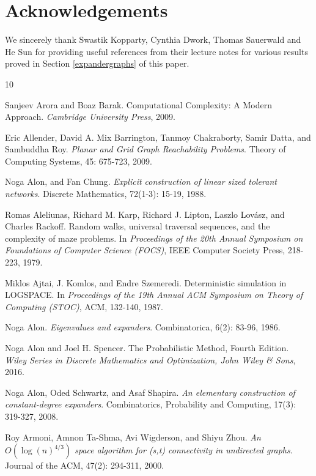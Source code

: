 \documentclass{article}
\begin{document}
\newpage

\section*{Acknowledgements}
We sincerely thank Swastik Kopparty, Cynthia Dwork, Thomas Sauerwald and He Sun for providing useful references from their lecture notes for various results proved in Section \ref{expandergraphs} of this paper.

\begin{thebibliography}{10}

{\sc Sanjeev Arora and Boaz Barak}. {Computational Complexity: A Modern Approach}. {\em Cambridge University Press}, 2009.

{\sc Eric Allender, David A. Mix Barrington, Tanmoy Chakraborty, Samir Datta, and Sambuddha Roy}. {\em Planar and Grid Graph Reachability Problems}. Theory of Computing Systems, 45: 675-723, 2009.

{\sc Noga Alon, and Fan Chung}. {\em Explicit construction of linear sized tolerant networks}. Discrete Mathematics, 72(1-3): 15-19, 1988.

{\sc Romas Aleliunas, Richard M. Karp, Richard J. Lipton, Laszlo Lov\'{a}sz, and Charles Rackoff}. {Random walks, universal traversal sequences, and the complexity of maze problems}. In {\em Proceedings of the 20th Annual Symposium on Foundations of Computer Science (FOCS)}, IEEE Computer Society Press, 218-223, 1979.

{\sc Miklos Ajtai, J. Komlos, and Endre Szemeredi}. {Deterministic simulation in LOGSPACE}. In {\em Proceedings of the 19th Annual ACM Symposium on Theory of Computing (STOC)}, ACM, 132-140, 1987.

{\sc Noga Alon}. {\em Eigenvalues and expanders}. Combinatorica, 6(2): 83-96, 1986.

{\sc Noga Alon and Joel H. Spencer}. {The Probabilistic Method, Fourth Edition}. {\em Wiley Series in Discrete Mathematics and Optimization, John Wiley \& Sons}, 2016.

{\sc Noga Alon, Oded Schwartz, and Asaf Shapira}. {\em An elementary construction of constant-degree expanders}. Combinatorics, Probability and Computing, 17(3): 319-327, 2008.

{\sc Roy Armoni, Amnon Ta-Shma, Avi Wigderson, and Shiyu Zhou}. {\em An $O(\log (n)^{4/3})$ space algorithm for {\rm(}s,t{\rm )} connectivity in undirected graphs}. Journal of the ACM, 47(2): 294-311, 2000.


\end{thebibliography}
\end{document}
